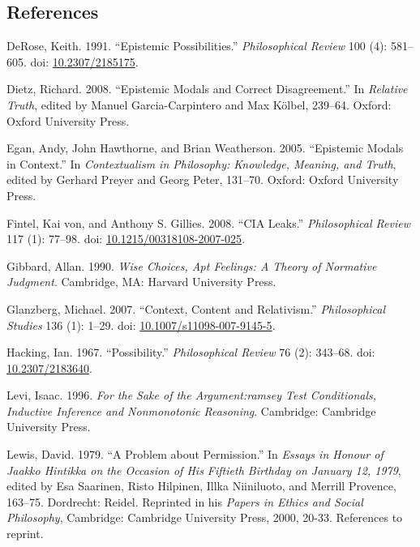 \documentclass[
  11pt,
  letterpaper,
  DIV=11,
  numbers=noendperiod,
  twoside]{scrartcl}
\newlength{\cslhangindent}
\newenvironment{CSLReferences}[2] %
 {\begin{list}{}{%
  \setlength{\itemindent}{0pt}
  \setlength{\leftmargin}{0pt}
  \setlength{\parsep}{0pt}
  \ifodd #1
   \setlength{\leftmargin}{\cslhangindent}
   \setlength{\itemindent}{-1\cslhangindent}
  \fi
  \setlength{\itemsep}{#2\baselineskip}}}
 {\end{list}}
\begin{document}
\subsection*{References}\label{references}

\label{refs}
\begin{CSLReferences}{1}{0}
DeRose, Keith. 1991. {``Epistemic Possibilities.''} \emph{Philosophical
Review} 100 (4): 581--605. doi:
\href{https://doi.org/10.2307/2185175}{10.2307/2185175}.

Dietz, Richard. 2008. {``Epistemic Modals and Correct Disagreement.''}
In \emph{Relative Truth}, edited by Manuel Garcia-Carpintero and Max
Kölbel, 239--64. Oxford: Oxford University Press.

Egan, Andy, John Hawthorne, and Brian Weatherson. 2005. {``{Epistemic
Modals in Context}.''} In \emph{Contextualism in Philosophy: Knowledge,
Meaning, and Truth}, edited by Gerhard Preyer and Georg Peter, 131--70.
Oxford: Oxford University Press.

Fintel, Kai von, and Anthony S. Gillies. 2008. {``CIA Leaks.''}
\emph{Philosophical Review} 117 (1): 77--98. doi:
\href{https://doi.org/10.1215/00318108-2007-025}{10.1215/00318108-2007-025}.

Gibbard, Allan. 1990. \emph{Wise Choices, Apt Feelings: A Theory of
Normative Judgment}. Cambridge, MA: Harvard University Press.

Glanzberg, Michael. 2007. {``Context, Content and Relativism.''}
\emph{Philosophical Studies} 136 (1): 1--29. doi:
\href{https://doi.org/10.1007/s11098-007-9145-5}{10.1007/s11098-007-9145-5}.

Hacking, Ian. 1967. {``Possibility.''} \emph{Philosophical Review} 76
(2): 343--68. doi:
\href{https://doi.org/10.2307/2183640}{10.2307/2183640}.

Levi, Isaac. 1996. \emph{For the Sake of the Argument:ramsey Test
Conditionals, Inductive Inference and Nonmonotonic Reasoning}.
Cambridge: Cambridge University Press.

Lewis, David. 1979. {``A Problem about Permission.''} In \emph{Essays in
Honour of {J}aakko Hintikka on the Occasion of His Fiftieth Birthday on
{J}anuary 12, 1979}, edited by Esa Saarinen, Risto Hilpinen, Illka
Niiniluoto, and Merrill Provence, 163--75. Dordrecht: Reidel. Reprinted
in his \emph{Papers in Ethics and Social Philosophy}, Cambridge:
Cambridge University Press, 2000, 20-33. References to reprint.


\end{CSLReferences}
\end{document}
